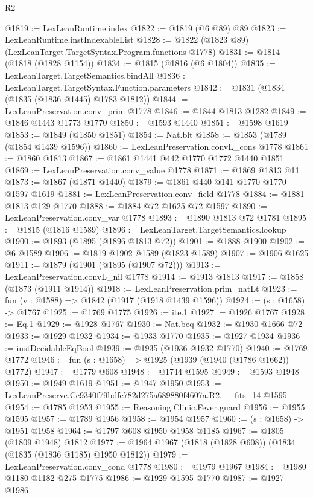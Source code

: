 \begin{lexlean}{R2}
\begin{coremodule}
@1819 := LexLeanRuntime.index
@1822 := @1819 (@6 @89) @89
@1823 := LexLeanRuntime.instIndexableList
@1828 := @1822 (@1823 @89) (LexLeanTarget.TargetSyntax.Program.functions @1778)
@1831 := @1814 (@1818 (@1828 @1154))
@1834 := @1815 (@1816 (@6 @1804))
@1835 := LexLeanTarget.TargetSemantics.bindAll
@1836 := LexLeanTarget.TargetSyntax.Function.parameters
@1842 := @1831 (@1834 (@1835 (@1836 @1445) @1783 @1812))
@1844 := LexLeanPreservation.conv_prim @1778
@1846 := @1844 @1813 @1282
@1849 := @1846 @1443 @1773 @1770
@1850 := @1593 @1440
@1851 := @1598 @1619
@1853 := @1849 (@1850 @1851)
@1854 := Nat.blt
@1858 := @1853 (@1789 (@1854 @1439 @1596))
@1860 := LexLeanPreservation.convL_cons @1778
@1861 := @1860 @1813
@1867 := @1861 @1441 @442 @1770 @1772 @1440 @1851
@1869 := LexLeanPreservation.conv_value @1778
@1871 := @1869 @1813 @11
@1873 := @1867 (@1871 @1440)
@1879 := @1861 @440 @141 @1770 @1770 @1597 @1619
@1881 := LexLeanPreservation.conv_field @1778
@1884 := @1881 @1813 @129 @1770
@1888 := @1884 @72 @1625 @72 @1597
@1890 := LexLeanPreservation.conv_var @1778
@1893 := @1890 @1813 @72 @1781
@1895 := @1815 (@1816 @1589)
@1896 := LexLeanTarget.TargetSemantics.lookup
@1900 := @1893 (@1895 (@1896 @1813 @72))
@1901 := @1888 @1900
@1902 := @6 @1589
@1906 := @1819 @1902 @1589 (@1823 @1589)
@1907 := @1906 @1625
@1911 := @1879 (@1901 (@1895 (@1907 @72)))
@1913 := LexLeanPreservation.convL_nil @1778
@1914 := @1913 @1813
@1917 := @1858 (@1873 (@1911 @1914))
@1918 := LexLeanPreservation.prim_natLt
@1923 := fun (v : @1588) => @1842 (@1917 (@1918 @1439 @1596))
@1924 := (s : @1658) -> @1767
@1925 := @1769 @1775
@1926 := ite.{1}
@1927 := @1926 @1767
@1928 := Eq.{1}
@1929 := @1928 @1767
@1930 := Nat.beq
@1932 := @1930 @1666 @72
@1933 := @1929 @1932
@1934 := @1933 @1770
@1935 := @1927 @1934
@1936 := instDecidableEqBool
@1939 := @1935 (@1936 @1932 @1770)
@1940 := @1769 @1772
@1946 := fun (s : @1658) => @1925 (@1939 (@1940 (@1786 @1662)) @1772)
@1947 := @1779 @608
@1948 := @1744 @1595
@1949 := @1593 @1948
@1950 := @1949 @1619
@1951 := @1947 @1950
@1953 := LexLeanPreserve.Cc9340f79bdfe782d275a689880f4607a.R2.__fits_14 @1595
@1954 := @1785 @1953
@1955 := Reasoning.Clinic.Fever.guard
@1956 := @1955 @1595
@1957 := @1789 @1956
@1958 := @1954 @1957
@1960 := (s : @1658) -> @1951 @1958
@1964 := @1797 @608 @1950 @1958 @1185
@1967 := @1805 (@1809 @1948) @1812
@1977 := @1964 @1967 (@1818 (@1828 @608)) (@1834 (@1835 (@1836 @1185) @1950 @1812))
@1979 := LexLeanPreservation.conv_cond @1778
@1980 := @1979 @1967
@1984 := @1980 @1180 @1182 @275 @1775
@1986 := @1929 @1595 @1770
@1987 := @1927 @1986

\end{coremodule}
\end{lexlean}
